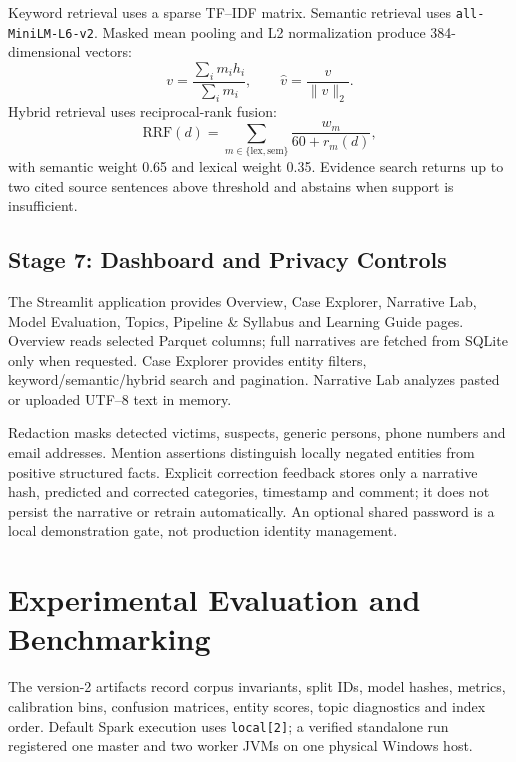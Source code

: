 \documentclass[conference]{IEEEtran}
\begin{document}
Keyword retrieval uses a sparse TF--IDF matrix. Semantic retrieval uses \texttt{all-MiniLM-L6-v2}. Masked mean pooling and L2 normalization produce 384-dimensional vectors:
\begin{equation}
v=\frac{\sum_i m_ih_i}{\sum_i m_i},
\qquad \hat v=\frac{v}{\|v\|_2}.
\end{equation}
Hybrid retrieval uses reciprocal-rank fusion:
\begin{equation}
\mathrm{RRF}(d)=
\sum_{m\in\{\mathrm{lex},\mathrm{sem}\}}
\frac{w_m}{60+r_m(d)},
\end{equation}
with semantic weight 0.65 and lexical weight 0.35. Evidence search returns up to two cited source sentences above threshold and abstains when support is insufficient.

\subsection{Stage 7: Dashboard and Privacy Controls}

The Streamlit application provides Overview, Case Explorer, Narrative Lab, Model Evaluation, Topics, Pipeline \& Syllabus and Learning Guide pages. Overview reads selected Parquet columns; full narratives are fetched from SQLite only when requested. Case Explorer provides entity filters, keyword/semantic/hybrid search and pagination. Narrative Lab analyzes pasted or uploaded UTF--8 text in memory.

Redaction masks detected victims, suspects, generic persons, phone numbers and email addresses. Mention assertions distinguish locally negated entities from positive structured facts. Explicit correction feedback stores only a narrative hash, predicted and corrected categories, timestamp and comment; it does not persist the narrative or retrain automatically. An optional shared password is a local demonstration gate, not production identity management.

\section{Experimental Evaluation and Benchmarking}

The version-2 artifacts record corpus invariants, split IDs, model hashes, metrics, calibration bins, confusion matrices, entity scores, topic diagnostics and index order. Default Spark execution uses \texttt{local[2]}; a verified standalone run registered one master and two worker JVMs on one physical Windows host.
\end{document}
